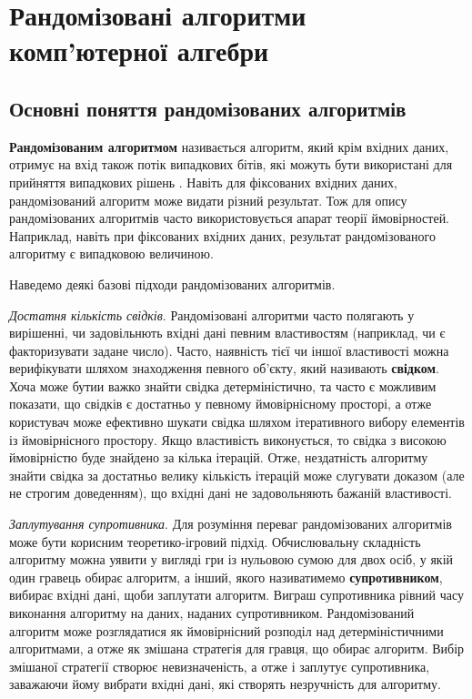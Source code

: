 \newpage
\renewcommand{\proofname}{Доведення}
\renewcommand{\chaptername}{РОЗДІЛ}
\chapter{Рандомізовані алгоритми комп'ютерної алгебри}
\label{ch2}

\section{Основні поняття рандомізованих алгоритмів}
\label{section.2.1}
\textbf{Рандомізованим алгоритмом} називається алгоритм, який крім вхідних даних, отримує на вхід також потік випадкових бітів, які можуть бути використані для прийняття випадкових рішень \cite{Karp1991}. Навіть для фіксованих вхідних даних, рандомізований алгоритм може видати різний результат. Тож для опису рандомізованих алгоритмів часто використовується апарат теорії ймовірностей. Наприклад, навіть при фіксованих вхідних даних, результат рандомізованого алгоритму є випадковою величиною.

Наведемо деякі базові підходи рандомізованих алгоритмів.

\textit{Достатня кількість свідків}. Рандомізовані алгоритми часто полягають у вирішенні, чи задовільнють вхідні дані певним властивостям (наприклад, чи є факторизувати задане число). Часто, наявність тієї чи іншої властивості можна верифікувати шляхом знаходження певного об'єкту, який називають \textbf{свідком}. Хоча може бутии важко знайти свідка детерміністично, та часто є можливим показати, що свідків є достатньо у певному ймовірнісному просторі, а отже користувач може ефективно шукати свідка шляхом ітеративного вибору елементів із ймовірнісного простору. Якщо властивість виконується, то свідка з високою ймовірністю буде знайдено за кілька ітерацій. Отже, нездатність алгоритму знайти свідка за достатньо велику кількість ітерацій може слугувати доказом (але не строгим доведенням), що вхідні дані не задовольняють бажаній властивості.

\textit{Заплутування супротивника}. Для розуміння переваг рандомізованих алгоритмів може бути корисним теоретико-ігровий підхід. Обчислювальну складність алгоритму можна уявити у вигляді гри із нульовою сумою для двох осіб, у якій один гравець обирає алгоритм, а інший, якого називатимемо \textbf{супротивником}, вибирає вхідні дані, щоби заплутати алгоритм. Виграш супротивника рівний часу виконання алгоритму на даних, наданих супротивником. Рандомізований алгоритм може розглядатися як ймовірнісний розподіл над детерміністичними алгоритмами, а отже як змішана стратегія для гравця, що обирає алгоритм. Вибір змішаної стратегії створює невизначеність, а отже і заплутує супротивника, заважаючи йому вибрати вхідні дані, які створять незручність для алгоритму.

